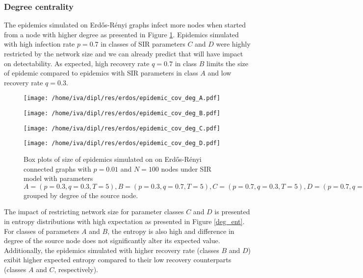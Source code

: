 \documentclass[times, utf8, diplomski]{fer}
\begin{document}
\subsubsection{Degree centrality}

The epidemics simulated on Erd{\H{o}}s-R{\'{e}}nyi graphs infect more nodes when started from a node with higher degree as presented in Figure \ref{erdos_deg_cov}. Epidemics simulated with high infection rate $p = 0.7$  in classes of SIR parameters $C$ and $D$ were highly restricted by the network size and  we can already predict that will have impact on detectability. As expected, high recovery rate $q = 0.7$ in class $B$ limits the size of epidemic compared to epidemics with SIR parameters in class $A$ and low recovery rate $q=0.3$.


\begin{figure}[H]
\begin{minipage}{\textwidth}
\begin{minipage}{0.47\textwidth}
\center
\texttt{[image: /home/iva/dipl/res/erdos/epidemic\_cov\_deg\_A.pdf]}
\end{minipage}
\begin{minipage}{0.47\textwidth}
\center
\texttt{[image: /home/iva/dipl/res/erdos/epidemic\_cov\_deg\_B.pdf]}
\end{minipage}

\begin{minipage}{0.47\textwidth}
\center
\texttt{[image: /home/iva/dipl/res/erdos/epidemic\_cov\_deg\_C.pdf]}
\end{minipage}
\begin{minipage}{0.47\textwidth}
\center
\texttt{[image: /home/iva/dipl/res/erdos/epidemic\_cov\_deg\_D.pdf]}
\end{minipage}
\caption{Box plots of size of epidemics simulated on on  Erd{\H{o}}s-R{\'{e}}nyi connected graphs with $p=0.01$ and $N=100$ nodes under SIR model with parameters $A = (p=0.3, q=0.3, T=5), B = (p=0.3, q=0.7, T=5), C = (p=0.7, q=0.3, T=5), D = (p=0.7, q=0.7, T=5)$ grouped by degree of the source node.}
\label{erdos_deg_cov}
\end{minipage}
\end{figure}

The impact of restricting network size  for parameter classes $C$ and $D$ is presented in entropy distributions with high expectation as presented in Figure \ref{deg_ent}. For classes of parameters $A$ and $B$, the entropy is also high and difference in degree of the source node does not significantly alter its expected value. Additionally, the epidemics simulated with higher recovery rate (classes $B$ and $D$) exibit higher expected entropy compared to their low recovery counterparts (classes $A$ and $C$, respectively). 
\end{document}
